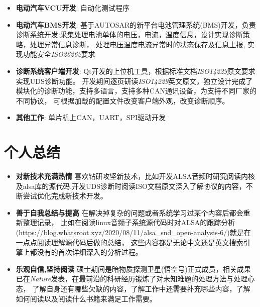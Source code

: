 \documentclass{resume}
\begin{document}
\begin{itemize}[parsep=0.2ex]
  \item \textbf{电动汽车VCU开发}: 自动化测试程序
\end{itemize}

\begin{itemize}[parsep=0.2ex]
    \item \textbf{电动汽车BMS开发}: \newline
    基于AUTOSAR的新平台电池管理系统(BMS)开发，负责诊断系统开发:采集处理电池单体的电压，电流，温度信息，设计实现诊断策略，处理异常信息诊断，
    处理电压温度电流异常时的状态保存及信息上报, 实现功能安全\emph{ISO26262}要求
  \item \textbf{诊断系统客户端开发}: \newline
    Qt开发的上位机工具，根据标准文档\emph{ISO14229}原文要求实现UDS诊断功能。
    开发期间逐页研读\emph{ISO14229}英文原文，独立设计完成了模块化的诊断功能，支持多语言，支持多种CAN通讯设备，为支持不同厂家的不同协议，
    可根据加载的配置文件改变客户端外观，改变诊断顺序。
  \item \textbf{其他工作}: \newline
    单片机上CAN，UART，SPI驱动开发
\end{itemize}

\section{个人总结}
\begin{itemize}[parsep=0.2ex]
  \item \textbf{对新技术充满热情}\newline
    喜欢钻研攻坚新技术，比如开发ALSA音频时研究阅读内核及alsa库的源代码,开发UDS诊断时阅读ISO文档原文深入了解协议的内容，不断尝试优化完成新技术开发。
  \item \textbf{善于自我总结与提高}\newline
    在解决掉复杂的问题或者系统学习过某个内容后都会重新整理记录，
比如在阅读linux音频子系统源代码时对ALSA的跟踪分析(https://blog.whatsroot.xyz/2020/08/11/alsa\_snd\_open-analysis-6/)就是在一点点阅读理解源代码后做的总结，
这些内容都是无论中文还是英文搜索引擎上都没有的首次详细深入的分析过程。
  \item \textbf{乐观自信,坚持阅读}\newline
    硕士期间是暗物质探测卫星(悟空号)正式成员，相关成果已在\emph{Nature}发表，在最前沿的科研经历锻炼了对未知难题的处理方法与处理心态，
    了解自身还有哪些欠缺的内容，了解工作中还需要补充哪些内容，了解如何阅读以及阅读什么书籍来满足工作需要。
\end{itemize}
\end{document}
